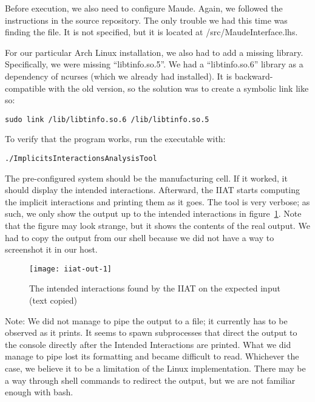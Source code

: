 Before execution, we also need to configure Maude.
Again, we followed the instructions in the source repository.
The only trouble we had this time was finding the file.
It is not specified, but it is located at /src/MaudeInterface.lhs.

For our particular Arch Linux installation, we also had to add a missing library.
Specifically, we were missing ``libtinfo.so.5''.
We had a ``libtinfo.so.6'' library as a dependency of ncurses (which we already had installed).
It is backward-compatible with the old version, so the solution was to create a symbolic link like so:
\begin{verbatim}sudo link /lib/libtinfo.so.6 /lib/libtinfo.so.5\end{verbatim}

To verify that the program works, run the executable with:
\begin{verbatim}./ImplicitsInteractionsAnalysisTool\end{verbatim}
The pre-configured system should be the manufacturing cell.
If it worked, it should display the intended interactions.
Afterward, the IIAT starts computing the implicit interactions and printing them as it goes.
The tool is very verbose; as such, we only show the output up to the intended interactions in figure~\ref{fig:iiat-out}.
Note that the figure may look strange, but it shows the contents of the real output.
We had to copy the output from our shell because we did not have a way to screenshot it in our host.
\begin{figure}[ht]
    \centering
    \texttt{[image: iiat-out-1]}
    \caption{The intended interactions found by the IIAT on the expected input (text copied)}
    \label{fig:iiat-out}
\end{figure}

Note: We did not manage to pipe the output to a file; it currently has to be observed as it prints.
It seems to spawn subprocesses that direct the output to the console directly after the Intended Interactions are printed.
What we did manage to pipe lost its formatting and became difficult to read.
Whichever the case, we believe it to be a limitation of the Linux implementation.
There may be a way through shell commands to redirect the output, but we are not familiar enough with bash.

